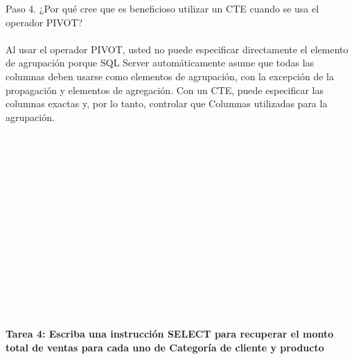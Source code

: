 \begin{flushleft}
Paso 4. ¿Por qué cree que es beneficioso utilizar un CTE cuando se usa el operador PIVOT? \\
\textbf{}\\
Al usar el operador PIVOT, usted no puede especificar directamente el elemento de agrupación porque SQL Server automáticamente asume que todas las columnas deben usarse como elementos de agrupación, con la excepción de la propagación y elementos de agregación. Con un CTE, puede especificar las columnas exactas y, por lo tanto, controlar que Columnas utilizadas para la agrupación.
\textbf{}\\
\textbf{}\\
\textbf{}\\
\textbf{}\\
\textbf{}\\
\textbf{}\\
\textbf{}\\
\textbf{}\\
\textbf{}\\
\textbf{}\\
\textbf{}\\
\textbf{}\\
\textbf{}\\
\textbf{}\\
\textbf{}\\
\textbf{}\\
\textbf{Tarea 4: Escriba una instrucción SELECT para recuperar el monto total de ventas para cada uno de Categoría de cliente y producto}
\textbf{}\\
\textbf{}\\


\end{flushleft}
